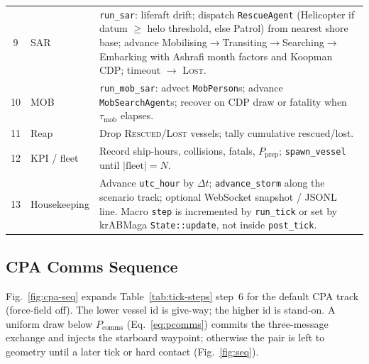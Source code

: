 \documentclass[cameraready]{Interspeech}
\begin{document}
\begin{table}[t]
\begin{tabularx}{\textwidth}{@{}c l >{\raggedright\arraybackslash}X@{}}
9 & SAR & \texttt{run\_sar}: liferaft drift; dispatch \texttt{RescueAgent} (Helicopter if datum $\ge$ helo threshold, else Patrol) from nearest shore base; advance Mobilising$\to$Transiting$\to$Searching$\to$Embarking with Ashrafi month factors and Koopman CDP; timeout $\to$ \textsc{Lost}. \\[2pt]
10 & MOB & \texttt{run\_mob\_sar}: advect \texttt{MobPerson}s; advance \texttt{MobSearchAgent}s; recover on CDP draw or fatality when $\tau_{\text{mob}}$ elapses. \\[2pt]
11 & Reap & Drop \textsc{Rescued}/\textsc{Lost} vessels; tally cumulative rescued/lost. \\[2pt]
12 & KPI / fleet & Record ship-hours, collisions, fatals, $P_{\text{prep}}$; \texttt{spawn\_vessel} until $|\text{fleet}|=N$. \\[2pt]
13 & Housekeeping & Advance \texttt{utc\_hour} by $\Delta t$; \texttt{advance\_storm} along the scenario track; optional WebSocket snapshot / JSONL line. Macro \texttt{step} is incremented by \texttt{run\_tick} or set by krABMaga \texttt{State::update}, not inside \texttt{post\_tick}. \\
\bottomrule
\end{tabularx}
\end{table}

\subsection{CPA Comms Sequence}
\label{apx:cpa-seq}

Fig.~\ref{fig:cpa-seq} expands Table~\ref{tab:tick-steps} step~6 for the default CPA track (force-field off). The lower vessel id is give-way; the higher id is stand-on. A uniform draw below $P_{\text{comms}}$ (Eq.~\ref{eq:pcomms}) commits the three-message exchange and injects the starboard waypoint; otherwise the pair is left to geometry until a later tick or hard contact (Fig.~\ref{fig:seq}).
\end{document}
